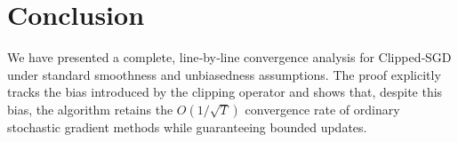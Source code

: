 \documentclass{article}
\begin{document}
\section*{Conclusion}
We have presented a complete, line‑by‑line convergence analysis for
Clipped‑SGD under standard smoothness and unbiasedness assumptions.  The proof
explicitly tracks the bias introduced by the clipping operator and shows that,
despite this bias, the algorithm retains the $O(1/\sqrt{T})$ convergence rate of
ordinary stochastic gradient methods while guaranteeing bounded updates.
\end{document}
